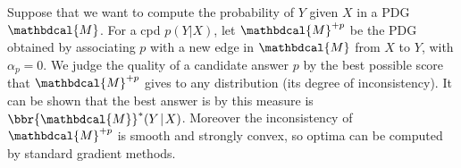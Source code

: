 \documentclass[letterpaper]{article} %
\theoremstyle{plain}
\theoremstyle{definition}
\theoremstyle{remark}
\newcommand{\commentout}[1]{\ignorespaces}
\newcommand{\dg}[1]{\mathbdcal{#1}}
\begin{document}
Suppose that we want to compute the probability of $Y$ given $X$ in a PDG $\dg M$. 
%
For a cpd $p(Y|X)$, let $\dg M^{+p}$ be the PDG obtained
by associating $p$ with a new edge in $\dg M$ from $X$ to $Y$, with
$\alpha_p \!=\! 0$. We judge the quality of a candidate answer $p$ 
by the best possible score that $\dg M^{+p}$ gives to any distribution 
(its degree of inconsistency). It can be shown that the best answer is 
by this measure is $\bbr{\dg M}^*(Y\!\mid\! X)$. 
Moreover the inconsistency of $\dg M^{+p}$ is smooth and strongly convex,
so optima can be computed by standard gradient methods.
\commentout{
We judge a candidate answer $p(Y \!\mid\! X)$ by the
}
\end{document}
